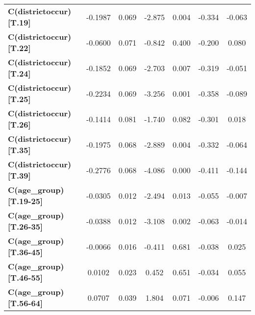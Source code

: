 \begin{center}
\begin{tabular}{lcccccc}
\textbf{C(districtoccur)[T.19]}                                                   &      -0.1987  &        0.069     &    -2.875  &         0.004        &       -0.334    &       -0.063     \\
\textbf{C(districtoccur)[T.22]}                                                   &      -0.0600  &        0.071     &    -0.842  &         0.400        &       -0.200    &        0.080     \\
\textbf{C(districtoccur)[T.24]}                                                   &      -0.1852  &        0.069     &    -2.703  &         0.007        &       -0.319    &       -0.051     \\
\textbf{C(districtoccur)[T.25]}                                                   &      -0.2234  &        0.069     &    -3.256  &         0.001        &       -0.358    &       -0.089     \\
\textbf{C(districtoccur)[T.26]}                                                   &      -0.1414  &        0.081     &    -1.740  &         0.082        &       -0.301    &        0.018     \\
\textbf{C(districtoccur)[T.35]}                                                   &      -0.1975  &        0.068     &    -2.889  &         0.004        &       -0.332    &       -0.064     \\
\textbf{C(districtoccur)[T.39]}                                                   &      -0.2776  &        0.068     &    -4.086  &         0.000        &       -0.411    &       -0.144     \\
\textbf{C(age\_group)[T.19-25]}                                                   &      -0.0305  &        0.012     &    -2.494  &         0.013        &       -0.055    &       -0.007     \\
\textbf{C(age\_group)[T.26-35]}                                                   &      -0.0388  &        0.012     &    -3.108  &         0.002        &       -0.063    &       -0.014     \\
\textbf{C(age\_group)[T.36-45]}                                                   &      -0.0066  &        0.016     &    -0.411  &         0.681        &       -0.038    &        0.025     \\
\textbf{C(age\_group)[T.46-55]}                                                   &       0.0102  &        0.023     &     0.452  &         0.651        &       -0.034    &        0.055     \\
\textbf{C(age\_group)[T.56-64]}                                                   &       0.0707  &        0.039     &     1.804  &         0.071        &       -0.006    &        0.147     \\

\end{tabular}
\end{center}
